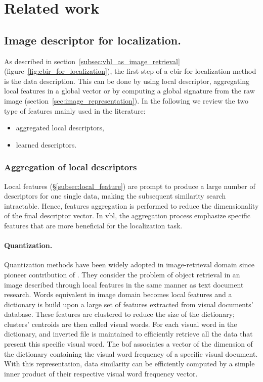 \section{Related work}
\label{sec:cbir_data_for_loc}

\subsection{Image descriptor for localization.}

As described in section~\ref{subsec:vbl_as_image_retrieval} (figure~\ref{fig:cbir_for_localization}), the first step of a \ac{cbir} for localization method is the data description. This can be done by using local descriptor, aggregating local features in a global vector or by computing a global signature from the raw image (section~\ref{sec:image_representation}). In the following we review the two type of features mainly used in the literature: 
\begin{itemize}
	\item aggregated local descriptors,
	\item learned descriptors.
\end{itemize}

\subsubsection{Aggregation of local descriptors}
\label{subsec:features_aggregation}
Local features (\S\ref{subsec:local_feature}) are prompt to produce a large number of descriptors for one single data, making the subsequent similarity search intractable. Hence, features aggregation is performed to reduce the dimensionality of the final descriptor vector. In \ac{vbl}, the aggregation process emphasize specific features that are more beneficial for the localization task.

\paragraph{Quantization.} Quantization methods have been widely adopted in image-retrieval domain since pioneer contribution of \citet{Sivic2003}. They consider the problem of object retrieval in an image described through local features in the same manner as text document research. Words equivalent in image domain becomes local features and a dictionary is build upon a large set of features extracted from visual documents' database. These features are clustered to reduce the size of the dictionary; clusters' centroids are then called visual words. For each visual word in the dictionary, and inverted file is maintained to efficiently retrieve all the data that present this specific visual word. The \ac{bof} associates a vector of the dimension of the dictionary containing the visual word frequency of a specific visual document. With this representation, data similarity can be efficiently computed by a simple inner product of their respective visual word frequency vector.

